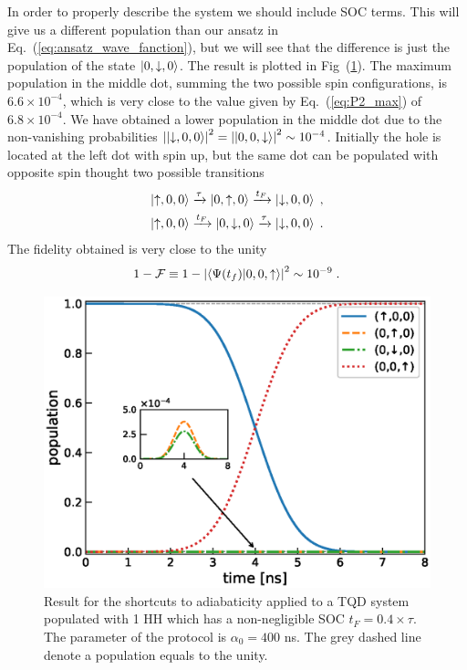 \documentclass[a4paper,11pt]{article}
\begin{document}
In order to properly describe the system we should include SOC terms. This will give us a different population than our ansatz in Eq.~(\ref{eq:ansatz_wave_fanction}), but we will see that the difference is just the population of the state $\ket{0,\downarrow,0}$. The result is plotted in Fig~(\ref{fig:STA_TQD_Results}). The maximum population in the middle dot, summing the two possible spin configurations, is $6.6\times 10^{-4}$, which is very close to the value given by Eq.~(\ref{eq:P2_max}) of $6.8\times 10^{-4}$. We have obtained a lower population in the middle dot due to the non-vanishing probabilities $\abs{\ket{\downarrow,0,0}}^2=\abs{\ket{0,0,\downarrow}}^2\sim 10^{-4}$. Initially the hole is located at the left dot with spin up, but the same dot can be populated with opposite spin thought two possible transitions
\begin{equation}
	\begin{split}
	\ket{\uparrow,0,0}\xrightarrow{\tau}\ket{0,\uparrow,0}\xrightarrow{t_F}\ket{\downarrow,0,0}\; ,\\
	\ket{\uparrow,0,0}\xrightarrow{t_F}\ket{0,\downarrow,0}\xrightarrow{\tau}\ket{\downarrow,0,0}\; .\\
	\end{split}
\end{equation}
The fidelity obtained is very close to the unity
\begin{equation}
	1-\mathcal{F}\equiv1-\abs{\braket{\Psi(t_f)}{0,0,\uparrow}}^2\sim 10^{-9}\; .
\end{equation}
\begin{figure}[!htbp]
	\centering
	\includegraphics[width=0.8\linewidth]{STA_TQD_Results.eps}
	\caption{Result for the shortcuts to adiabaticity applied to a TQD system populated with 1 HH which has a non-negligible SOC $t_F=0.4\times\tau$. The parameter of the protocol is $\alpha_0=400$ ns. The grey dashed line denote a population equals to the unity.}
	\label{fig:STA_TQD_Results}
\end{figure}
\end{document}
